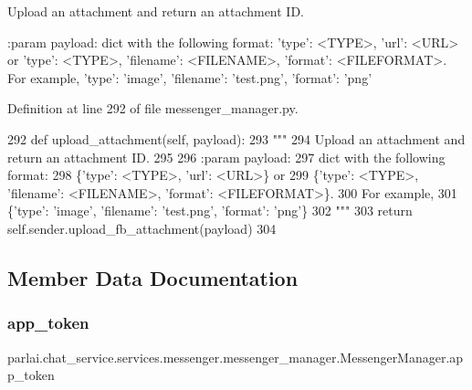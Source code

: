 \begin{DoxyVerb}Upload an attachment and return an attachment ID.

:param payload:
    dict with the following format:
{'type': <TYPE>, 'url': <URL>} or
{'type': <TYPE>, 'filename': <FILENAME>, 'format': <FILEFORMAT>}.
For example,
{'type': 'image', 'filename': 'test.png', 'format': 'png'}
\end{DoxyVerb}
 

Definition at line 292 of file messenger\+\_\+manager.\+py.


\begin{DoxyCode}
292     \textcolor{keyword}{def }upload\_attachment(self, payload):
293         \textcolor{stringliteral}{"""}
294 \textcolor{stringliteral}{        Upload an attachment and return an attachment ID.}
295 \textcolor{stringliteral}{}
296 \textcolor{stringliteral}{        :param payload:}
297 \textcolor{stringliteral}{            dict with the following format:}
298 \textcolor{stringliteral}{                \{'type': <TYPE>, 'url': <URL>\} or}
299 \textcolor{stringliteral}{                \{'type': <TYPE>, 'filename': <FILENAME>, 'format': <FILEFORMAT>\}.}
300 \textcolor{stringliteral}{                For example,}
301 \textcolor{stringliteral}{                \{'type': 'image', 'filename': 'test.png', 'format': 'png'\}}
302 \textcolor{stringliteral}{        """}
303         \textcolor{keywordflow}{return} self.sender.upload\_fb\_attachment(payload)
304 \end{DoxyCode}


\subsection{Member Data Documentation}
\mbox{\label{classparlai_1_1chat__service_1_1services_1_1messenger_1_1messenger__manager_1_1MessengerManager_aa52ef2280a697896f4d3b5bdb322e553}} 
\subsubsection{\texorpdfstring{app\+\_\+token}{app\_token}}
{\footnotesize\ttfamily parlai.\+chat\+\_\+service.\+services.\+messenger.\+messenger\+\_\+manager.\+Messenger\+Manager.\+app\+\_\+token}



